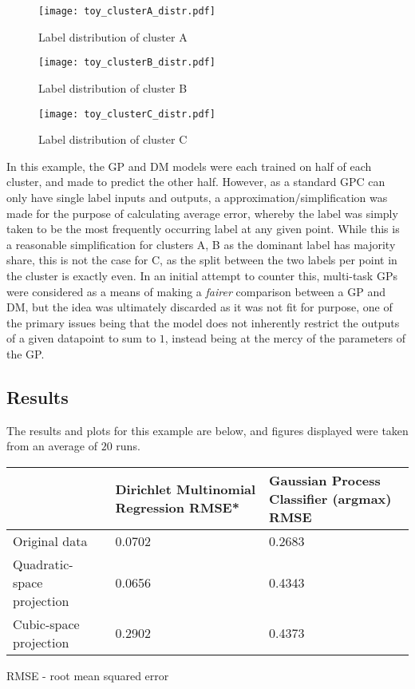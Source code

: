 \begin{figure}[H]
    \begin{minipage}{.49\linewidth}
        \texttt{[image: toy\_clusterA\_distr.pdf]}
        \caption{Label distribution of cluster A}
        \label{fig:toyclusterA}
    \end{minipage}
    \hfill
    \begin{minipage}{.49\linewidth}
        \texttt{[image: toy\_clusterB\_distr.pdf]}
        \caption{Label distribution of cluster B}
        \label{fig:toyclusterB}
    \end{minipage}
    \begin{minipage}{.49\linewidth}
        \texttt{[image: toy\_clusterC\_distr.pdf]}
        \caption{Label distribution of cluster C}
        \label{fig:toyclusterC}
    \end{minipage}
\end{figure}

In this example, the GP and DM models were each trained on half of each cluster, and made to predict the other half. However, as a standard GPC can only have single label inputs and outputs, a approximation/simplification was made for the purpose of calculating average error, whereby the label was simply taken to be the most frequently occurring label at any given point. While this is a reasonable simplification for clusters A, B as the dominant label has majority share, this is not the case for C, as the split between the two labels per point in the cluster is exactly even. In an initial attempt to counter this, multi-task GPs were considered as a means of making a \textit{fairer} comparison between a GP and DM, but the idea was ultimately discarded as it was not fit for purpose, one of the primary issues being that the model does not inherently restrict the outputs of a given datapoint to sum to $1$, instead being at the mercy of the parameters of the GP. 

\subsection{Results}

The results and plots for this example are below, and figures displayed were taken from an average of $20$ runs.

\begin{table}[H]
    \label{table:toy_gm_vs_gp}
    \begin{tabular}{|C{4cm}|C{4cm}|C{6cm}|}
        \hline
        & Dirichlet Multinomial Regression RMSE* & Gaussian Process Classifier (argmax) RMSE \\\hline
        Original data & 0.0702 & 0.2683\\\hline
        Quadratic-space projection & 0.0656 & 0.4343\\\hline
        Cubic-space projection & 0.2902 & 0.4373 \\\hline
    \end{tabular}
    \begingroup
    \tiny{RMSE - root mean squared error}
    \endgroup
\end{table}

